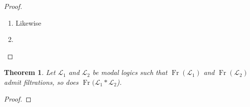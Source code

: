 \documentclass[a4paper]{article}
\theoremstyle{defin}
\theoremstyle{theorem}
\newtheorem{theorem}{Theorem}
\theoremstyle{prop}
\theoremstyle{lemma}
\theoremstyle{fact}
\theoremstyle{ex}
\theoremstyle{col}
\theoremstyle{claim}
\begin{document}
\begin{proof}
\begin{enumerate}
\begin{proof}
\begin{enumerate}
where $R'$ is either $R_{\Delta_i}^{min}$ or its converse. We clearly have $\mathcal{M}, z \models \Box p_{\psi}$, since $\mathcal{M}, x \models \Box p_{\psi}$ implies $\mathcal{M}, u_{n} \models \Diamond \Box p_{\psi}$. After that we apply the following property of ${\bf K}5$-models:
\begin{center}
  For each $a, b \in M_i$ such that $a R_i b$ we have $\mathcal{M}_i, a \models \Diamond \Box p_{\psi}$ iff $\mathcal{M}_i, b \models \Diamond \Box p_{\psi}$
\end{center}
Then $\mathcal{M}_i, y \models p_{\psi}$ by IH.
    \end{enumerate}
  \end{proof}

  Finally, we consider a model $\widehat{\mathcal{M}} = \langle \widehat{W}, \widehat{R}_1, \widehat{R}_2, \vartheta \rangle$, where $\widehat{R_{\Gamma'}}_i = {{R_i}^{min}_{\Gamma'}}^E$ and $\vartheta(p)$ is defined as usual for $p \in \Gamma$. $\widehat{\mathcal{M}}$ is a filtration of $\mathcal{M}$ through $\Gamma'$.

  Let $\hat{x} \widehat{R_{\Gamma'}}_i \hat{y}$ and $\mathcal{M}, x \models \Box_i \psi$ for $\Box_i \psi \in \Gamma$. Then $\mathcal{M}_i, x \models \Box p_{\psi}$, so $\widehat{\mathcal{M}_i}, \hat{x} \models \Box p_{\psi}$.
  By the claim above, $\widehat{\mathcal{M}_i}$ is a filtration of $\mathcal{M}_i$ through $\Delta_i$, so $\mathcal{M}_i, y \models p_{\psi}$. Then $\mathcal{M}, y \models \psi$.

  \item Likewise
  \item
  \end{enumerate}
\end{proof}

\begin{theorem}
  Let $\mathcal{L}_1$ and $\mathcal{L}_2$ be modal logics such that $\operatorname{Fr}(\mathcal{L}_1)$ and $\operatorname{Fr}(\mathcal{L}_2)$ admit filtrations, so does $\operatorname{Fr}(\mathcal{L}_1 * \mathcal{L}_2$).
\end{theorem}

\begin{proof}

\end{proof}



\end{document}

